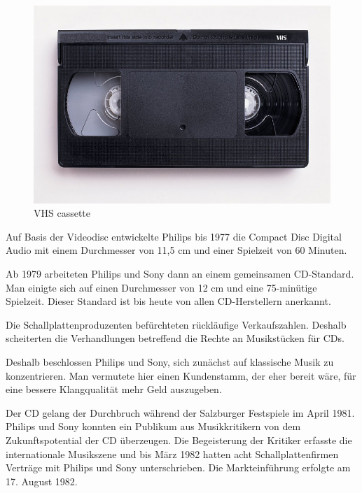 \begin{figure}[h]
\begin{center}
\begin{minipage}[t]{0.3\textwidth}
            \begin{center}
                \includegraphics[height=0.1\textheight]{Bilder/Optische_Datentraeger_Die_Compact_Disc/Geschichte/vhs.png}
                \caption[VHS cassette \newline \url{https://upload.wikimedia.org/wikipedia/commons/6/67/VHS-cassette.jpg} (zuletzt aufgerufen am 19.09.2015)]{VHS cassette}
                \label{fig:vhs}
            \end{center}
        \end{minipage}
    \end{center}
\end{figure}

Auf Basis der Videodisc entwickelte Philips bis 1977 die Compact Disc Digital
Audio mit einem Durchmesser von 11,5 cm und einer Spielzeit von 60 Minuten.

Ab 1979 arbeiteten Philips und Sony dann an einem gemeinsamen CD-Standard. Man
einigte sich auf einen Durchmesser von 12 cm und eine 75-minütige Spielzeit.
Dieser Standard ist bis heute von allen CD-Herstellern anerkannt. \cite{cds}

Die Schallplattenproduzenten befürchteten rückläufige Verkaufszahlen. Deshalb
scheiterten die Verhandlungen betreffend die Rechte an Musikstücken für CDs.

Deshalb beschlossen Philips und Sony, sich zunächst auf klassische Musik zu
konzentrieren. Man vermutete hier einen Kundenstamm, der eher bereit wäre, für
eine bessere Klangqualität mehr Geld auszugeben.

Der CD gelang der Durchbruch während der Salzburger Festspiele im April 1981.
Philips und Sony konnten ein Publikum aus Musikkritikern von dem
Zukunftspotential der CD überzeugen. Die Begeisterung der Kritiker erfasste die
internationale Musikszene und bis März 1982 hatten acht Schallplattenfirmen
Verträge mit Philips und Sony unterschrieben. Die Markteinführung erfolgte am
17. August 1982. \cite{cuz}

